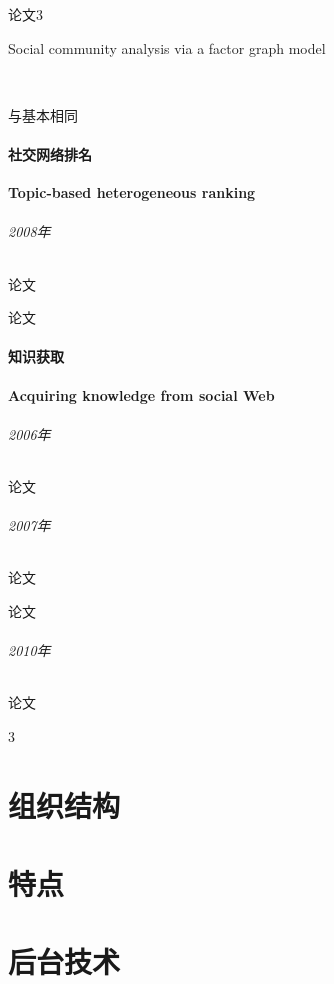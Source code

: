 \documentclass[UTF8]{ctexrep}
\begin{document}
\subparagraph{论文3~\cite{yang2010social}}
\subparagraph{Social community analysis via a factor graph model}~\cite{tan2010social}
\par 与\cite{tang2009topic}基本相同



\subsection{社交网络排名}
\textbf{Topic-based heterogeneous ranking}

\paragraph{2008年}
\subparagraph{论文\cite{tang2008topic}}
\subparagraph{论文\cite{tang2008arnetminer}}


\subsection{知识获取}
\textbf{Acquiring knowledge from social Web}

\paragraph{2006年}
\subparagraph{论文\cite{tang2006tree}}

\paragraph{2007年}
\subparagraph{论文\cite{tang2007social}}
\subparagraph{论文 \cite{zhang2007constraint}}

\paragraph{2010年}
\subparagraph{论文\cite{tang2010combination}}


3~\cite{tang2011unified}
~\cite{wang2011adana}
~\cite{zhang2018name}


\part{组织结构}

\part{特点}
\part{后台技术}


\end{document}
